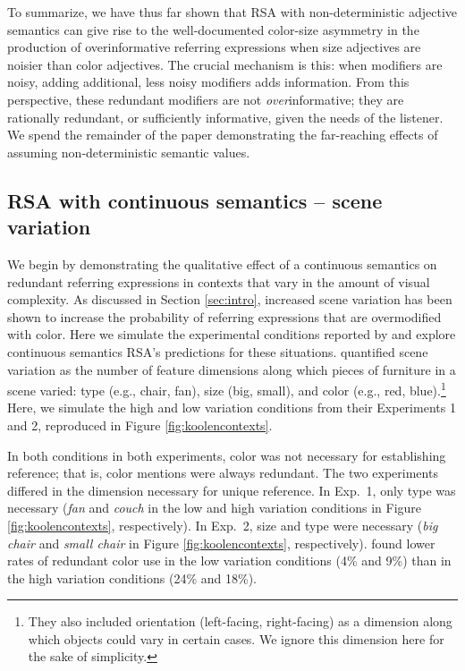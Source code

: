 \documentclass[11pt]{article}
\newcommand{\figref}[1]{Figure \ref{#1}}
\newcommand{\sectionref}[1]{Section \ref{#1}}
\begin{document}
To summarize, we have thus far shown that RSA with non-deterministic adjective semantics can give rise to the well-documented color-size asymmetry in the production of overinformative referring expressions when size adjectives are noisier than color adjectives. The crucial mechanism is this: when modifiers are noisy, adding additional, less noisy modifiers adds information. From this perspective, these redundant modifiers are not \emph{over}informative; they are rationally redundant, or sufficiently informative, given the needs of the listener. We spend the remainder of the paper demonstrating the far-reaching effects of assuming non-deterministic semantic values.

\subsection{RSA with continuous semantics -- scene variation}
\label{sec:modelkoolen}

We begin by demonstrating the qualitative effect of a continuous semantics on redundant referring expressions in contexts that vary in the amount of visual complexity. As discussed in \sectionref{sec:intro}, increased scene variation has been shown to increase the probability of referring expressions that are overmodified with color. Here we simulate the experimental conditions reported by  and explore continuous semantics RSA's predictions for these situations.   quantified scene variation as the number of feature dimensions along which pieces of furniture in a scene varied: type (e.g., chair, fan), size (big, small), and color (e.g., red, blue).\footnote{They also included orientation (left-facing, right-facing) as a dimension along which objects could vary in certain cases. We ignore this dimension here for the sake of simplicity.} Here, we  simulate the high and low variation conditions from their Experiments 1 and 2, reproduced in \figref{fig:koolencontexts}. 

In both conditions in both experiments, color was not necessary for establishing reference; that is, color mentions were always redundant. The two experiments differed in the dimension necessary for unique reference. In Exp.~1, only type was necessary (\emph{fan} and \emph{couch} in the low and high variation conditions in \figref{fig:koolencontexts}, respectively). In Exp.~2, size and type were necessary (\emph{big chair} and \emph{small chair} in \figref{fig:koolencontexts}, respectively).  found lower rates of redundant color use in the low variation conditions (4\% and 9\%) than in the high variation conditions (24\% and 18\%).
\end{document}
